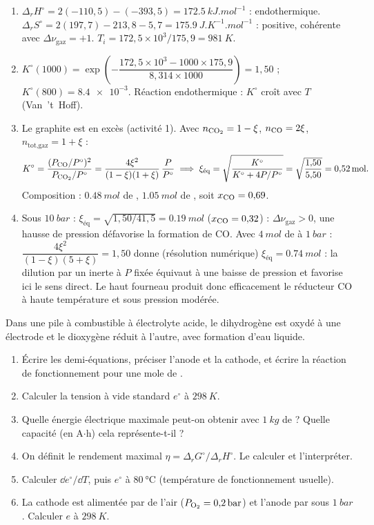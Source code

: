 \correction
\begin{enumerate}
  \item $\Delta_rH^\circ = 2(-110{,}5) - (-393{,}5) = \SI{+172,5}{kJ.mol^{-1}}$ : endothermique. $\Delta_rS^\circ = 2(197{,}7) - 213{,}8 - 5{,}7 = \SI{+175,9}{J.K^{-1}.mol^{-1}}$ : positive, cohérente avec $\Delta\nu_{\text{gaz}} = +1$. $T_i = 172{,}5\times10^3/175{,}9 = \SI{981}{K}$.
  \item $K^\circ(1000) = \exp\left(-\dfrac{172{,}5\times10^3 - 1000\times175{,}9}{8{,}314\times1000}\right) = 1{,}50$ ; $K^\circ(800) = \num{8,4e-3}$. Réaction endothermique : $K^\circ$ croît avec $T$ (Van~'t~Hoff).
  \item Le graphite est en excès (activité 1). Avec $n_{\ce{CO2}} = 1-\xi$, $n_{\ce{CO}} = 2\xi$, $n_{\text{tot,gaz}} = 1+\xi$ :
  \[ K^\circ = \frac{(P_{\ce{CO}}/P^\circ)^2}{P_{\ce{CO2}}/P^\circ} = \frac{4\xi^2}{(1-\xi)(1+\xi)}\,\frac{P}{P^\circ} \;\Longrightarrow\; \xi_{\text{éq}} = \sqrt{\frac{K^\circ}{K^\circ + 4P/P^\circ}} = \sqrt{\frac{1{,}50}{5{,}50}} = \SI{0,52}{mol}. \]
  Composition : $\SI{0,48}{mol}$ de , $\SI{1,05}{mol}$ de , soit $x_{\ce{CO}} = 0{,}69$.
  \item Sous $\SI{10}{bar}$ : $\xi_{\text{éq}} = \sqrt{1{,}50/41{,}5} = \SI{0,19}{mol}$ ($x_{\ce{CO}} = 0{,}32$) : $\Delta\nu_{\text{gaz}} > 0$, une hausse de pression défavorise la formation de CO. Avec $\SI{4}{mol}$ de  à $\SI{1}{bar}$ : $\dfrac{4\xi^2}{(1-\xi)(5+\xi)} = 1{,}50$ donne (résolution numérique) $\xi_{\text{éq}} = \SI{0,74}{mol}$ : la dilution par un inerte à $P$ fixée équivaut à une baisse de pression et favorise ici le sens direct. Le haut fourneau produit donc efficacement le réducteur CO à haute température et sous pression modérée.
\end{enumerate}

\label{exo:pac}
Dans une pile à combustible à électrolyte acide, le dihydrogène est oxydé à une électrode et le dioxygène réduit à l'autre, avec formation d'eau liquide.
\begin{enumerate}
  \item Écrire les demi-équations, préciser l'anode et la cathode, et écrire la réaction de fonctionnement pour une mole de .
  \item Calculer la tension à vide standard $e^\circ$ à $\SI{298}{K}$.
  \item Quelle énergie électrique maximale peut-on obtenir avec $\SI{1}{kg}$ de  ? Quelle capacité (en A$\cdot$h) cela représente-t-il ?
  \item On définit le rendement maximal $\eta = \Delta_rG^\circ/\Delta_rH^\circ$. Le calculer et l'interpréter.
  \item Calculer $\dd e^\circ/\dd T$, puis $e^\circ$ à $\SI{80}{\celsius}$ (température de fonctionnement usuelle).
  \item La cathode est alimentée par de l'air ($P_{\ce{O2}} = \SI{0,2}{bar}$) et l'anode par  sous $\SI{1}{bar}$. Calculer $e$ à $\SI{298}{K}$.
\end{enumerate}

